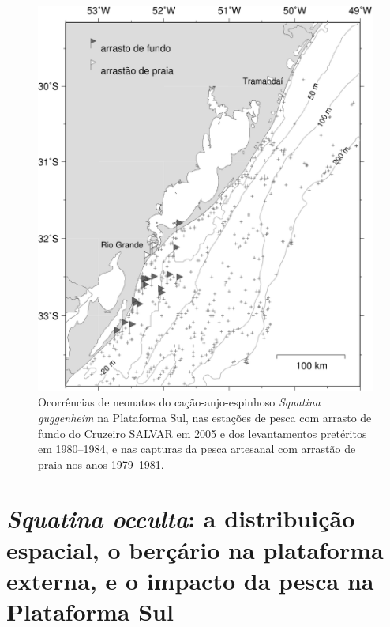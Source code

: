 \documentclass[a4paper,11pt,twoside,showtrims,onecolumn,openright,final]{memoir}
\begin{document}
\begin{figure}
\begin{center}
\includegraphics[width=\textwidth]{GUGGENHEIM_MAPA_NEONATOS}
\end{center}
\caption[Ocorrências de neonatos do cação-anjo-espinhoso \emph{Squatina guggenheim} na Plataforma Sul]
	{Ocorrências de neonatos do cação-anjo-espinhoso \emph{Squatina guggenheim} na Plataforma Sul, 
	 nas estações de pesca com arrasto de fundo do Cruzeiro SALVAR em 2005 e 
	 dos levantamentos pretéritos em 1980--1984, e nas capturas da pesca artesanal 
	 com arrastão de praia nos anos 1979--1981.}
\label{fig:guggenheim-mapa-neonatos}
\end{figure}


\section*{\emph{Squatina occulta}: a distribuição espacial, o berçário na plataforma externa, 
          e o impacto da pesca na Plataforma Sul }

%
%
\end{document}
